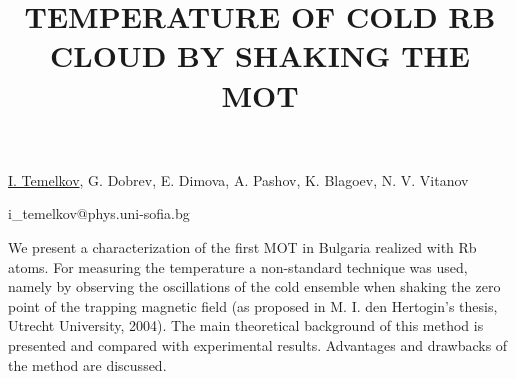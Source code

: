 \title{TEMPERATURE OF COLD RB CLOUD BY SHAKING THE MOT}

\underline{I. Temelkov}, G. Dobrev, E. Dimova, A. Pashov, K. Blagoev, N. V. Vitanov

{\normalsize{\vspace{-4mm}
\unisofia

\email i\_temelkov@phys.uni-sofia.bg}}

We present a characterization of the first MOT in Bulgaria realized with
Rb atoms. For measuring the temperature a non-standard technique was used, namely
by observing the oscillations of the cold ensemble when shaking the zero point of the
trapping magnetic field (as proposed in M. I. den Hertogin's thesis, Utrecht University, 2004).
The main theoretical background of this method
is presented and compared with experimental results. Advantages and
drawbacks of the method are discussed.

\vspace{\baselineskip} 